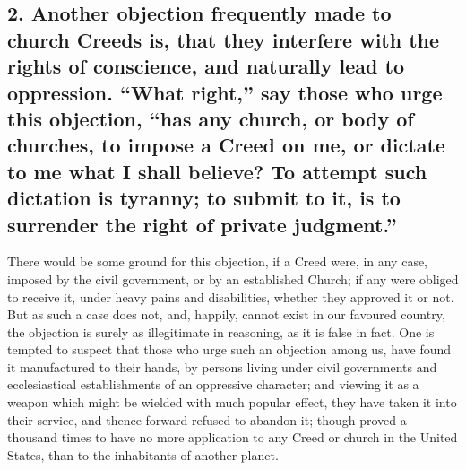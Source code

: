\documentclass[
]{book}
\begin{document}
\hypertarget{another-objection-frequently-made-to-church-creeds-is-that-they-interfere-with-the-rights-of-conscience-and-naturally-lead-to-oppression.-what-right-say-those-who-urge-this-objection-has-any-church-or-body-of-churches-to-impose-a-creed-on-me-or-dictate-to-me-what-i-shall-believe-to-attempt-such-dictation-is-tyranny-to-submit-to-it-is-to-surrender-the-right-of-private-judgment.}{%
\subsection{2. Another objection frequently made to church Creeds is, that they interfere with the rights of conscience, and naturally lead to oppression. ``What right,'' say those who urge this objection, ``has any church, or body of churches, to impose a Creed on me, or dictate to me what I shall believe? To attempt such dictation is tyranny; to submit to it, is to surrender the right of private judgment.''}\label{another-objection-frequently-made-to-church-creeds-is-that-they-interfere-with-the-rights-of-conscience-and-naturally-lead-to-oppression.-what-right-say-those-who-urge-this-objection-has-any-church-or-body-of-churches-to-impose-a-creed-on-me-or-dictate-to-me-what-i-shall-believe-to-attempt-such-dictation-is-tyranny-to-submit-to-it-is-to-surrender-the-right-of-private-judgment.}}

There would be some ground for this objection, if a Creed were, in any case, imposed by the civil government, or by an established Church; if any were obliged to receive it, under heavy pains and disabilities, whether they approved it or not. But as such a case does not, and, happily, cannot exist in our favoured country, the objection is surely as illegitimate in reasoning, as it is false in fact. One is tempted to suspect that those who urge such an objection among us, have found it manufactured to their hands, by persons living under civil governments and ecclesiastical establishments of an oppressive character; and viewing it as a weapon which might be wielded with much popular effect, they have taken it into their service, and thence forward refused to abandon it; though proved a thousand times to have no more application to any Creed or church in the United States, than to the inhabitants of another planet.
\end{document}
